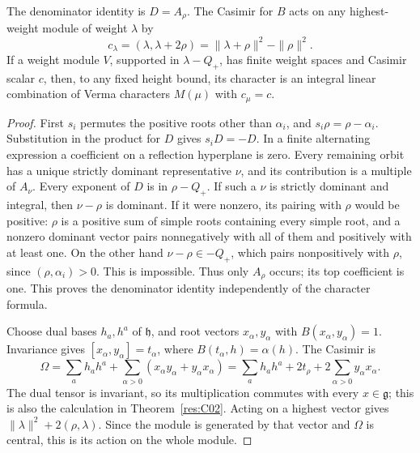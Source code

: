 \begin{proposition}
\label{res:H02}
The denominator identity is \(D=A_\rho\).
The Casimir for \(B\) acts on any highest-weight module of weight
\(\lambda\) by
\[
 c_\lambda=(\lambda,\lambda+2\rho)
           =\|\lambda+\rho\|^2-\|\rho\|^2 .
\]
If a weight module \(V\), supported in \(\lambda-Q_+\), has finite
weight spaces and Casimir scalar \(c\), then, to any fixed height
bound, its character is an integral linear combination of
Verma characters \(M(\mu)\) with \(c_\mu=c\).
\end{proposition}
\begin{proof}
First \(s_i\) permutes the positive roots other than \(\alpha_i\),
and \(s_i\rho=\rho-\alpha_i\). Substitution in the product for \(D\)
gives \(s_iD=-D\).
In a finite alternating expression a coefficient on a reflection
hyperplane is zero. Every remaining orbit has a unique strictly
dominant representative \(\nu\), and its contribution is a
multiple of \(A_\nu\).
Every exponent of \(D\) is in \(\rho-Q_+\).
If such a \(\nu\) is strictly dominant and integral, then
\(\nu-\rho\) is dominant. If it were nonzero, its pairing with
\(\rho\) would be positive: \(\rho\) is a positive sum of simple
roots containing every simple root, and a nonzero dominant vector
pairs nonnegatively with all of them and positively with at least
one. On the other hand \(\nu-\rho\in-Q_+\), which pairs
nonpositively with \(\rho\), since
\((\rho,\alpha_i)>0\). This is impossible.
Thus only \(A_\rho\) occurs; its top coefficient is one.
This proves the denominator identity independently of the character
formula.

Choose dual bases \(h_a,h^a\) of \(\mathfrak h\), and root vectors
\(x_\alpha,y_\alpha\) with \(B(x_\alpha,y_\alpha)=1\).
Invariance gives
\([x_\alpha,y_\alpha]=t_\alpha\), where
\(B(t_\alpha,h)=\alpha(h)\).
The Casimir is
\[
 \Omega=\sum_a h_ah^a+
       \sum_{\alpha>0}(x_\alpha y_\alpha+y_\alpha x_\alpha)
 =\sum_a h_ah^a+2t_\rho+
       2\sum_{\alpha>0}y_\alpha x_\alpha.
\]
The dual tensor is invariant, so its multiplication commutes with
every \(x\in\mathfrak g\); this is also the calculation in
Theorem~\ref{res:C02}. Acting on a highest vector gives
\(\|\lambda\|^2+2(\rho,\lambda)\).
Since the module is generated by that vector and \(\Omega\) is
central, this is its action on the whole module.


\end{proof}
